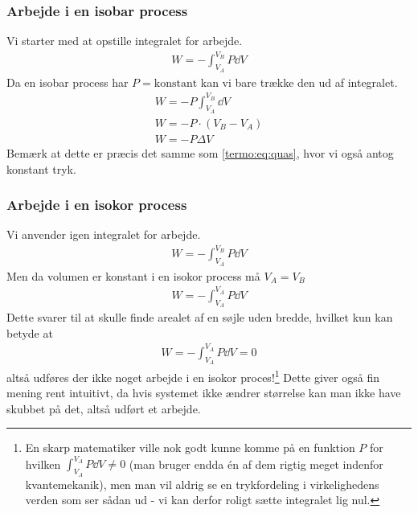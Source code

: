 \documentclass[crop=false, class=memoir]{standalone}
\begin{document}
\subsubsection{Arbejde i en isobar process}
Vi starter med at opstille integralet for arbejde.
\begin{align}
    W = - \int_{V_A}^{V_B} P \dd{V}
\end{align}
Da en isobar process har $P = \text{konstant}$ kan vi bare trække den ud af integralet.
\begin{align}
    W = -P \int_{V_A}^{V_B} \dd{V}\\
    W = - P \cdot (V_B - V_A)\\
    W = - P \Delta V
    \label{termo:eq:isobar_work}
\end{align}
Bemærk at dette er præcis det samme som \cref{termo:eq:quas}, hvor vi også antog konstant tryk.

\subsubsection{Arbejde i en isokor process}
Vi anvender igen integralet for arbejde.
\begin{align}
    W = - \int_{V_A}^{V_B} P \dd{V}
\end{align}
Men da volumen er konstant i en isokor process må $V_A = V_B$
\begin{align}
    W = - \int_{V_A}^{V_A} P \dd{V}
\end{align}
Dette svarer til at skulle finde arealet af en søjle uden bredde, hvilket kun kan betyde at
\begin{align}
    W = - \int_{V_A}^{V_A} P \dd{V} = 0
    \label{termo:eq:korwork}
\end{align}
altså udføres der ikke noget arbejde i en isokor proces!\footnote{En skarp matematiker ville nok godt kunne komme på en funktion $P$ for hvilken $\int_{V_A}^{V_A} P \dd{V} \neq 0$ (man bruger endda én af dem rigtig meget indenfor kvantemekanik), men man vil aldrig se en trykfordeling i virkelighedens verden som ser sådan ud - vi kan derfor roligt sætte integralet lig nul.} Dette giver også fin mening rent intuitivt, da hvis systemet ikke ændrer størrelse kan man ikke have skubbet på det, altså udført et arbejde. 
\end{document}

